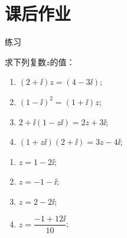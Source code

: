 \section{课后作业}
  \begin{exercise}{\heiti 练习}\\
    \item 求下列复数$z$的值： \begin{multicols}{2}
          \begin{enumerate}[label=\arabic*)]
            \item $(2+\ii)z=(4-3\ii)$;
            \vspace{2cm}
            \item $(1-\ii)^2=(1+\ii)z$;
            \vspace{2cm}
            \item $2+\ii(1-z\ii)=2z+3\ii$;
            \vspace{2cm}
            \item $(1+z\ii)(2+\ii)=3z-4\ii$;
            \vspace{2cm}
          \end{enumerate}
          \begin{answer}
            \begin{enumerate}[itemindent=1em,listparindent=6em, label=\arabic*)]
              \item $z=1-2\ii$;
              \item $z=-1-\ii$;
              \item $z=2-2\ii$;
              \item $z=\dfrac{-1+12\ii}{10}$;
            \end{enumerate}
          \end{answer}
        \end{multicols}
  \end{exercise}

